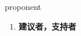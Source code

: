 
\begin{frame}
{\huge proponent}
\begin{center}
\begin{enumerate}\Large
  \item \textbf{建议者，支持者}
\end{enumerate}
\end{center}
\end{frame}
